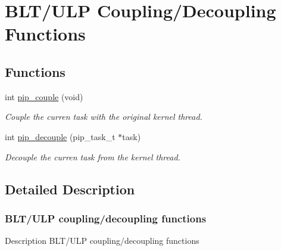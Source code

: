 \hypertarget{group__ULP-6-coupling}{\section{B\-L\-T/\-U\-L\-P Coupling/\-Decoupling Functions}
\label{group__ULP-6-coupling}
}
\subsection*{Functions}
\begin{DoxyCompactItemize}
\item 
int \hyperlink{group__ULP-6-coupling_ga62b74934c0295bbe1aeab544365eb20f}{pip\-\_\-couple} (void)
\begin{DoxyCompactList}\small\item\em Couple the curren task with the original kernel thread. \end{DoxyCompactList}\item 
int \hyperlink{group__ULP-6-coupling_ga1c77a30388d68e5f12667007ae430c1b}{pip\-\_\-decouple} (pip\-\_\-task\-\_\-t $\ast$task)
\begin{DoxyCompactList}\small\item\em Decouple the curren task from the kernel thread. \end{DoxyCompactList}\end{DoxyCompactItemize}


\subsection{Detailed Description}
\hypertarget{ulp-coupling}{}\subsubsection{B\-L\-T/\-U\-L\-P coupling/decoupling functions}\label{ulp-coupling}
\begin{DoxyParagraph}{Description}
B\-L\-T/\-U\-L\-P coupling/decoupling functions 
\end{DoxyParagraph}


